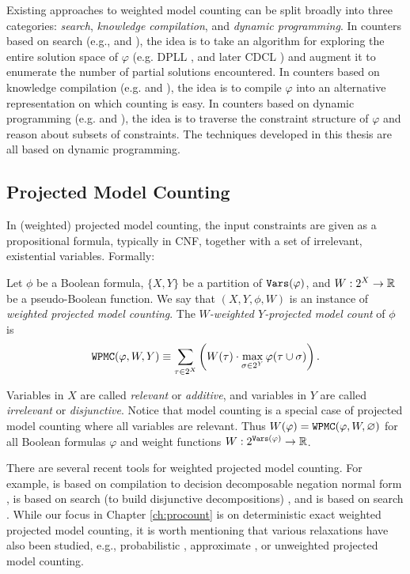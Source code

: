 Existing approaches to weighted model counting can be split broadly into three categories: \emph{search}, \emph{knowledge compilation}, and \emph{dynamic programming}. In counters based on search (e.g.,   \cite{SBK05} and  \cite{Thurley2006}), the idea is to take an algorithm for exploring the entire solution space of $\varphi$ (e.g. DPLL \cite{davis1960computing,davis1962machine}, and later CDCL \cite{biere2009conflict}) and augment it to enumerate the number of partial solutions encountered. In counters based on knowledge compilation (e.g.  \cite{OD15} and  \cite{LM17}), the idea is to compile $\varphi$ into an alternative representation on which counting is easy. In counters based on dynamic programming (e.g.  \cite{DPV20} and  \cite{FHWZ18,FHZ19}), the idea is to traverse the constraint structure of $\varphi$ and reason about subsets of constraints. 
The techniques developed in this thesis are all based on dynamic programming.

\subsection{Projected Model Counting}
In (weighted) projected model counting, the input constraints are given as a propositional formula, typically in CNF, together with a set of irrelevant, existential variables.
Formally:
\begin{definition}
	Let $\phi$ be a Boolean formula, $\{X, Y\}$ be a partition of $\texttt{\upshape Vars}(\varphi)$, and $W: 2^X \to \mathbb{R}$ be a pseudo-Boolean function. We say that $(X, Y, \phi, W)$ is an instance of \emph{weighted projected model counting}.
	The \emph{$W$-weighted $Y$-projected model count} of $\phi$ is
	$$\texttt{\upshape WPMC}(\varphi, W, Y) \equiv \sum_{\tau \in 2^X} \left(  W(\tau) \cdot \max_{\sigma \in 2^Y} \varphi(\tau \cup \sigma)  \right).$$
\end{definition}

Variables in $X$ are called \emph{relevant} or \emph{additive}, and variables in $Y$ are called \emph{irrelevant} or \emph{disjunctive}. 
Notice that model counting is a special case of projected model counting where all variables are relevant. Thus $W(\varphi) = \texttt{\upshape WPMC}(\varphi, W, \varnothing)$ for all Boolean formulas $\varphi$ and weight functions $W: 2^{\texttt{\upshape Vars}(\varphi)} \rightarrow \mathbb{R}$. 

There are several recent tools for weighted projected model counting.
For example, \dfp{} is based on compilation to decision decomposable negation normal form \cite{lagniez2019recursive}, \projmc{} is based on search (to build disjunctive decompositions) \cite{lagniez2019recursive}, and \ssat{} is based on search \cite{lee2017solving}. 
While our focus in Chapter \ref{ch:procount} is on deterministic exact weighted projected model counting, it is worth mentioning that various relaxations have also been studied, e.g., probabilistic \cite{sharma2019ganak}, approximate \cite{ermon2013taming,fremont2017maximum,soos2019bird}, or unweighted \cite{zawadzki2013generalization,aziz2015projected,mohle2018dualizing,hecher2020taming} projected model counting.